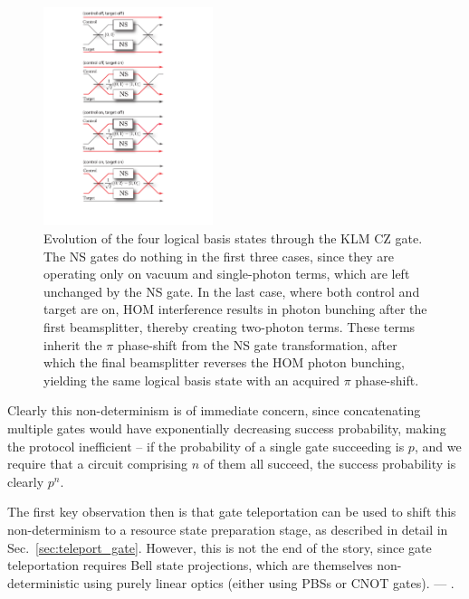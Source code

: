 \begin{figure}[!htb]
\includegraphics[width=0.44\textwidth]{KLM_optical_paths}
\caption{Evolution of the four logical basis states through the KLM CZ gate. The NS gates do nothing in the first three cases, since they are operating only on vacuum and single-photon terms, which are left unchanged by the NS gate. In the last case, where both control and target are on, HOM interference results in photon bunching after the first beamsplitter, thereby creating two-photon terms. These terms inherit the $\pi$ phase-shift from the NS gate transformation, after which the final beamsplitter reverses the HOM photon bunching, yielding the same logical basis state with an acquired $\pi$ phase-shift.} \label{fig:KLM_explain} 
\end{figure}

Clearly this non-determinism is of immediate concern, since concatenating multiple gates would have exponentially decreasing success probability, making the protocol inefficient -- if the probability of a single gate succeeding is $p$, and we require that a circuit comprising $n$ of them all succeed, the success probability is clearly $p^n$.

The first key observation then is that gate teleportation can be used to shift this non-determinism to a resource state preparation stage, as described in detail in Sec.~\ref{sec:teleport_gate}. However, this is not the end of the story, since gate teleportation requires Bell state projections, which are themselves non-deterministic using purely linear optics (either using PBSs or CNOT gates). --- .

